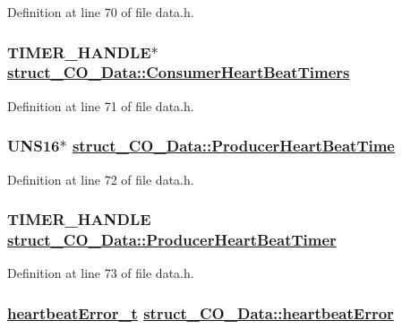 Definition at line 70 of file data.h.\hypertarget{structstruct__CO__Data_e0b1fd1bec517c2bc12c5a4fd72adca6}{
\subsubsection[ConsumerHeartBeatTimers]{\setlength{\rightskip}{0pt plus 5cm}TIMER\_\-HANDLE$\ast$ \hyperlink{structstruct__CO__Data_e0b1fd1bec517c2bc12c5a4fd72adca6}{struct\_\-CO\_\-Data::Consumer\-Heart\-Beat\-Timers}}}
\label{structstruct__CO__Data_e0b1fd1bec517c2bc12c5a4fd72adca6}




Definition at line 71 of file data.h.\hypertarget{structstruct__CO__Data_61d5500b982867b523baf6668a2c377d}{
\subsubsection[ProducerHeartBeatTime]{\setlength{\rightskip}{0pt plus 5cm}UNS16$\ast$ \hyperlink{structstruct__CO__Data_61d5500b982867b523baf6668a2c377d}{struct\_\-CO\_\-Data::Producer\-Heart\-Beat\-Time}}}
\label{structstruct__CO__Data_61d5500b982867b523baf6668a2c377d}




Definition at line 72 of file data.h.\hypertarget{structstruct__CO__Data_914dd3ff14e15217fe67c0804200a200}{
\subsubsection[ProducerHeartBeatTimer]{\setlength{\rightskip}{0pt plus 5cm}TIMER\_\-HANDLE \hyperlink{structstruct__CO__Data_914dd3ff14e15217fe67c0804200a200}{struct\_\-CO\_\-Data::Producer\-Heart\-Beat\-Timer}}}
\label{structstruct__CO__Data_914dd3ff14e15217fe67c0804200a200}




Definition at line 73 of file data.h.\hypertarget{structstruct__CO__Data_2ec2bc87656945d2c7dda7ebe662b245}{
\subsubsection[heartbeatError]{\setlength{\rightskip}{0pt plus 5cm}\hyperlink{lifegrd_8h_eca3959d33fceb33487363a0493d3b7d}{heartbeat\-Error\_\-t} \hyperlink{structstruct__CO__Data_2ec2bc87656945d2c7dda7ebe662b245}{struct\_\-CO\_\-Data::heartbeat\-Error}}}
\label{structstruct__CO__Data_2ec2bc87656945d2c7dda7ebe662b245}




